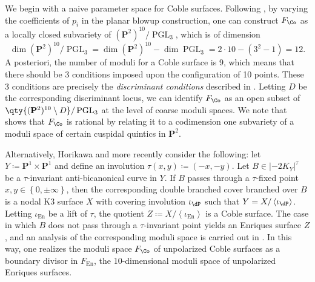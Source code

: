 \documentclass{amsart}
\begin{document}
\begin{remark}

We begin with a naive parameter space for Coble surfaces. Following \cite{DK13}, by varying the coefficients of \(p_i\) in the planar blowup construction, one can construct \(F_\Co\) as a locally closed subvariety of \(({\mathbf{P}}^2)^{10}/\operatorname{PGL}_3\), which is of dimension \[
\dim ({\mathbf{P}}^2)^{10}/\operatorname{PGL}_3 = \dim ({\mathbf{P}}^2)^{10} - \dim \operatorname{PGL}_3 = 2\cdot 10 - (3^2-1) = 12
.\] A posteriori, the number of moduli for a Coble surface is 9, which means that there should be 3 conditions imposed upon the configuration of 10 points. These 3 conditions are precisely the \emph{discriminant conditions} described in \cite[\S 2,\,Prop. (10)]{Cob19}. Letting \(D\) be the corresponding discriminant locus, we can identify \(F_{\Co}\) as an open subset of \(\qty{ ({\mathbf{P}}^2)^{10} \setminus D }/\operatorname{PGL}_3\) at the level of coarse moduli spaces. We note that \cite{DK13} shows that \(F_\Co\) is rational by relating it to a codimension one subvariety of a moduli space of certain cuspidal quintics in \({\mathbf{P}}^2\).

\end{remark}

\begin{remark}

Alternatively, Horikawa \cite{Hor78b} and more recently \cite{AEGS23} consider the following: let \(Y\coloneqq{\mathbf{P}}^1\times {\mathbf{P}}^1\) and define an involution \(\tau(x,y) \coloneqq(-x,-y)\). Let \(B\in{\left\lvert {-2K_{Y}} \right\rvert}^\tau\) be a \(\tau\)-invariant anti-bicanonical curve in \(Y\). If \(B\) passes through a \(\tau\)-fixed point \(x,y\in \left\{{0, \pm \infty}\right\}\), then the corresponding double branched cover branched over \(B\) is a nodal K3 surface \(X\) with covering involution \(\iota_{\dP}\) such that \(Y = X/\left\langle{\iota_{\dP}}\right\rangle\). Letting \(\iota_{\operatorname{En}}\) be a lift of \(\tau\), the quotient \(Z\coloneqq X/\left\langle{\iota_{\operatorname{En}}}\right\rangle\) is a Coble surface. The case in which \(B\) does not pass through a \(\tau\)-invariant point yields an Enriques surface \(Z\), and an analysis of the corresponding moduli space is carried out in \cite{AEGS23}. In this way, one realizes the moduli space \(F_{\Co}\) of unpolarized Coble surfaces as a boundary divisor in \(F_{\operatorname{En}}\), the 10-dimensional moduli space of unpolarized Enriques surfaces.

\end{remark}
\end{document}
